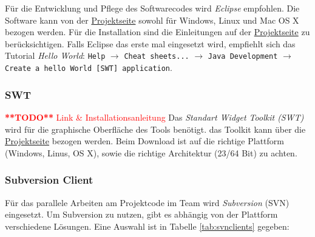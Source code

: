 \documentclass[a4paper,11pt,pdftex,twoside]{scrartcl}
\newcommand{\comment}[1]{\textcolor{red}{>>[\TODO] #1<<}}
\newcommand{\eclipseprojectplace}{\href{http://www.eclipse.org/downloads/}{Projektseite}\xspace}
\renewcommand{\comment}[1]{\textcolor{red}{\textbf{**TODO**} #1}}
\begin{document}
Für die Entwicklung und Pflege des Softwarecodes wird  \emph{Eclipse} empfohlen.
Die Software kann von der \eclipseprojectplace sowohl für Windows, Linux und Mac OS X bezogen werden.
Für die Installation sind die Einleitungen auf der \eclipseprojectplace zu berücksichtigen.
Falls Eclipse das erste mal eingesetzt wird, empfiehlt sich das Tutorial \emph{Hello World}: \texttt{Help} $\rightarrow$ \texttt{Cheat sheets...} $\rightarrow$ \texttt{Java Development} $\rightarrow$ \texttt{Create a hello World [SWT] application}.

\subsubsection{SWT}
\comment{Link \& Installationsanleitung}
Das \emph{Standart Widget Toolkit (SWT)} wird für die graphische Oberfläche des Tools benötigt.
das Toolkit kann über die \href{http://www.eclipse.org/swt/}{Projektseite} bezogen werden.
Beim Download ist auf die richtige Plattform (Windows, Linus, OS X), sowie die richtige Architektur (23/64 Bit) zu achten.



\subsubsection{Subversion Client}


Für das parallele Arbeiten am Projektcode im Team wird \textit{Subversion} (SVN) eingesetzt.
Um Subversion zu nutzen, gibt es abhängig von der Plattform verschiedene Lösungen.
Eine Auswahl ist in Tabelle \ref{tab:svnclients} gegeben:
\end{document}
